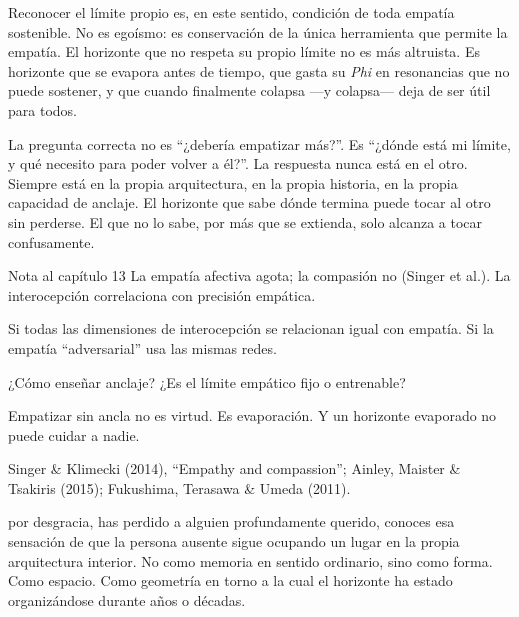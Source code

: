 Reconocer el límite propio es, en este sentido, condición de toda empatía sostenible. No es egoísmo: es conservación de la única herramienta que permite la empatía. El horizonte que no respeta su propio límite no es más altruista. Es horizonte que se evapora antes de tiempo, que gasta su \emph{Phi} en resonancias que no puede sostener, y que cuando finalmente colapsa —y colapsa— deja de ser útil para todos.

La pregunta correcta no es “¿debería empatizar más?”. Es “¿dónde está mi límite, y qué necesito para poder volver a él?”. La respuesta nunca está en el otro. Siempre está en la propia arquitectura, en la propia historia, en la propia capacidad de anclaje. El horizonte que sabe dónde termina puede tocar al otro sin perderse. El que no lo sabe, por más que se extienda, solo alcanza a tocar confusamente.

\begin{notacap}{Nota al capítulo 13}
 La empatía afectiva agota; la compasión no (Singer et al.). La interocepción correlaciona con precisión empática.

 Si todas las dimensiones de interocepción se relacionan igual con empatía. Si la empatía “adversarial” usa las mismas redes.

 ¿Cómo enseñar anclaje? ¿Es el límite empático fijo o entrenable?

 Empatizar sin ancla no es virtud. Es evaporación. Y un horizonte evaporado no puede cuidar a nadie.

 Singer \& Klimecki (2014), “Empathy and compassion”; Ainley, Maister \& Tsakiris (2015); Fukushima, Terasawa \& Umeda (2011).
\end{notacap}
\noindent {} por desgracia, has perdido a alguien profundamente querido, conoces esa sensación de que la persona ausente sigue ocupando un lugar en la propia arquitectura interior. No como memoria en sentido ordinario, sino como forma. Como espacio. Como geometría en torno a la cual el horizonte ha estado organizándose durante años o décadas.

